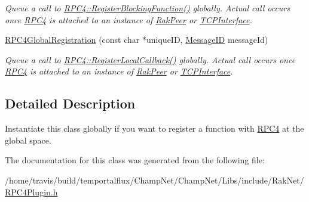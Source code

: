 \begin{DoxyCompactItemize}
\begin{DoxyCompactList}\small\item\em Queue a call to \hyperlink{class_rak_net_1_1_r_p_c4_a274362402c9476feb9575d06b75a5263}{R\-P\-C4\-::\-Register\-Blocking\-Function()} globally. Actual call occurs once \hyperlink{class_rak_net_1_1_r_p_c4}{R\-P\-C4} is attached to an instance of \hyperlink{class_rak_net_1_1_rak_peer}{Rak\-Peer} or \hyperlink{class_rak_net_1_1_t_c_p_interface}{T\-C\-P\-Interface}. \end{DoxyCompactList}\item 
\hypertarget{class_rak_net_1_1_r_p_c4_global_registration_a31eb00ac83c6e6316b4e49a5891eaf8e}{\hyperlink{class_rak_net_1_1_r_p_c4_global_registration_a31eb00ac83c6e6316b4e49a5891eaf8e}{R\-P\-C4\-Global\-Registration} (const char $\ast$unique\-I\-D, \hyperlink{namespace_rak_net_a1b2f3bf4bad2bb6a8360a12295fbed0c}{Message\-I\-D} message\-Id)}\label{class_rak_net_1_1_r_p_c4_global_registration_a31eb00ac83c6e6316b4e49a5891eaf8e}

\begin{DoxyCompactList}\small\item\em Queue a call to \hyperlink{class_rak_net_1_1_r_p_c4_a71f5f6d32e12adf3715d9c5faea25439}{R\-P\-C4\-::\-Register\-Local\-Callback()} globally. Actual call occurs once \hyperlink{class_rak_net_1_1_r_p_c4}{R\-P\-C4} is attached to an instance of \hyperlink{class_rak_net_1_1_rak_peer}{Rak\-Peer} or \hyperlink{class_rak_net_1_1_t_c_p_interface}{T\-C\-P\-Interface}. \end{DoxyCompactList}\end{DoxyCompactItemize}


\subsection{Detailed Description}
Instantiate this class globally if you want to register a function with \hyperlink{class_rak_net_1_1_r_p_c4}{R\-P\-C4} at the global space. 

The documentation for this class was generated from the following file\-:\begin{DoxyCompactItemize}
\item 
/home/travis/build/temportalflux/\-Champ\-Net/\-Champ\-Net/\-Libs/include/\-Rak\-Net/\hyperlink{_r_p_c4_plugin_8h}{R\-P\-C4\-Plugin.\-h}\end{DoxyCompactItemize}
